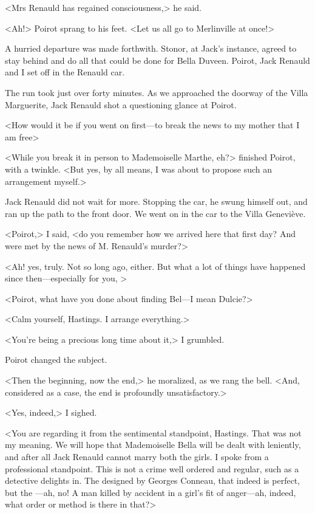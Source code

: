  <Mrs Renauld has regained consciousness,> he said. 

 <Ah!> Poirot sprang to his feet. <Let us all go to Merlinville at once!> 

 A hurried departure was made forthwith. Stonor, at Jack's instance, agreed to stay behind and do all that could be done for Bella Duveen. Poirot, Jack Renauld and I set off in the Renauld car. 

 The run took just over forty minutes. As we approached the doorway of the Villa Marguerite, Jack Renauld shot a questioning glance at Poirot. 

 <How would it be if you went on first—to break the news to my mother that I am free\longdash> 

 <While you break it in person to Mademoiselle Marthe, eh?> finished Poirot, with a twinkle. <But yes, by all means, I was about to propose such an arrangement myself.> 

 Jack Renauld did not wait for more. Stopping the car, he swung himself out, and ran up the path to the front door. We went on in the car to the Villa Geneviève. 

 <Poirot,> I said, <do you remember how we arrived here that first day? And were met by the news of M. Renauld's murder?> 

 <Ah! yes, truly. Not so long ago, either. But what a lot of things have happened since then—especially for you, > 

 <Poirot, what have you done about finding Bel—I mean Dulcie?> 

 <Calm yourself, Hastings. I arrange everything.> 

 <You're being a precious long time about it,> I grumbled. 

 Poirot changed the subject. 

 <Then the beginning, now the end,> he moralized, as we rang the bell. <And, considered as a case, the end is profoundly unsatisfactory.> 

 <Yes, indeed,> I sighed. 

 <You are regarding it from the sentimental standpoint, Hastings. That was not my meaning. We will hope that Mademoiselle Bella will be dealt with leniently, and after all Jack Renauld cannot marry both the girls. I spoke from a professional standpoint. This is not a crime well ordered and regular, such as a detective delights in. The  designed by Georges Conneau, that indeed is perfect, but the —ah, no! A man killed by accident in a girl's fit of anger—ah, indeed, what order or method is there in that?> 

